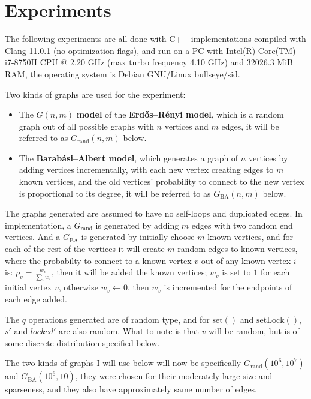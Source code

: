 \documentclass[12pt]{report}
\begin{document}
\chapter{Experiments}

The following experiments are all done with C++ implementations compiled with Clang 11.0.1 (no optimization flags),
and run on a PC with Intel(R) Core(TM) i7-8750H CPU @ 2.20 GHz (max turbo frequency 4.10 GHz) and 32026.3 MiB RAM,
the operating system is Debian GNU/Linux bullseye/sid.

Two kinds of graphs are used for the experiment:
\begin{itemize}
	\item The $ G(n, m) $ \textbf{model} of the \textbf{Erdős–Rényi model},
		  which is a random graph out of all possible graphs with $ n $ vertices and $ m $ edges,
		  it will be referred to as $ G_\mathrm{rand}(n, m) $ below.\cite{er59}
	\item The \textbf{Barabási–Albert model},
		  which generates a graph of $ n $ vertices by adding vertices incrementally,
		  with each new vertex creating edges to $ m $ known vertices,
		  and the old vertices' probability to connect to the new vertex is proportional to its degree,
		  it will be referred to as $ G_\mathrm{BA}(n, m) $ below.\cite{ba02}
\end{itemize}

The graphs generated are assumed to have no self-loops and duplicated edges.
In implementation, a $ G_\mathrm{rand} $ is generated by adding $ m $ edges with two random end vertices.
And a $ G_\mathrm{BA} $ is generated by initially choose $ m $ known vertices,
and for each of the rest of the vertices it will create $ m $ random edges to known vertices,
where the probabilty to connect to a known vertex $ v $ out of any known vertex $ i $ is: $ p_v = \frac{w_v}{\sum_i w_i} $,
then it will be added the known vertices;
$ w_v $ is set to $ 1 $ for each initial vertex $ v $, otherwise $ w_v \gets 0 $,
then $ w_v $ is incremented for the endpoints of each edge added.

The $ q $ operations generated are of random type,
and for $ \mathrm{set}() $ and $ \mathrm{setLock}() $, $ s' $ and $ \mathit{locked}' $ are also random.
What to note is that $ v $ will be random, but is of some discrete distribution specified below.

\sloppy The two kinds of graphs I will use below will now be specifically $ G_\mathrm{rand}(10^6, 10^7) $ and $ G_\mathrm{BA}(10^6, 10) $,
they were chosen for their moderately large size and sparseness,
and they also have approximately same number of edges.
\end{document}
